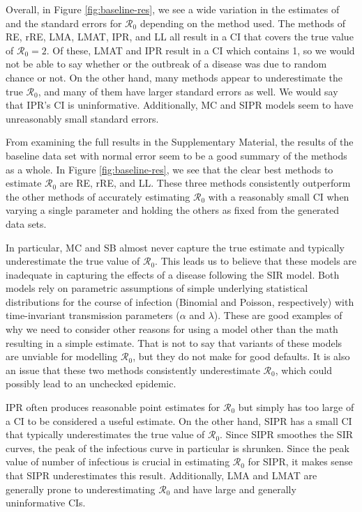\documentclass[12pt]{article}
\newcommand{\rr}{\ensuremath{\mathcal{R}_0}}
\begin{document}
Overall, in Figure \ref{fig:baseline-res}, we see a wide variation in the estimates of and the standard errors for $\rr$ depending on the method used.  The methods of RE, rRE, LMA, LMAT, IPR, and LL all result in a CI that covers the true value of $\rr=2$.  Of these, LMAT and IPR result in a CI which contains 1, so we would not be able to say whether or the outbreak of a disease was due to random chance or not. On the other hand, many methods appear to underestimate the true $\rr$, and many of them have larger standard errors as well.  We would say that IPR's CI is uninformative. Additionally, MC and SIPR models seem to have unreasonably small standard errors.

From examining the full results in the Supplementary Material, the results of the baseline data set with normal error seem to be a good summary of the methods as a whole.  In Figure \ref{fig:baseline-res}, we see that the clear best methods to estimate $\rr$ are RE, rRE, and LL.  These three methods consistently outperform the other methods of accurately estimating $\rr$ with a reasonably small CI when varying a single parameter and holding the others as fixed from the generated data sets.

In particular, MC and SB almost never capture the true estimate and typically underestimate the true value of $\rr$.  This leads us to believe that these models are inadequate in capturing the effects of a disease following the SIR model.  Both models rely on parametric assumptions of simple underlying statistical distributions for the course of infection (Binomial and Poisson, respectively) with time-invariant transmission parameters ($\alpha$ and $\lambda$).  These are good examples of why we need to consider other reasons for using a model other than the math resulting in a simple estimate.  That is not to say that variants of these models are unviable for modelling $\rr$, but they do not make for good defaults.  It is also an issue that these two methods consistently underestimate $\rr$, which could possibly lead to an unchecked epidemic.

IPR often produces reasonable point estimates for $\rr$ but simply has too large of a CI to be considered a useful estimate.  On the other hand, SIPR has a small CI that typically underestimates the true value of $\rr$.  Since SIPR smoothes the SIR curves, the peak of the infectious curve in particular is shrunken.  Since the peak value of number of infectious is crucial in estimating $\rr$ for SIPR, it makes sense that SIPR underestimates this result.  Additionally, LMA and LMAT are generally prone to underestimating $\rr$ and have large and generally uninformative CIs.
\end{document}
